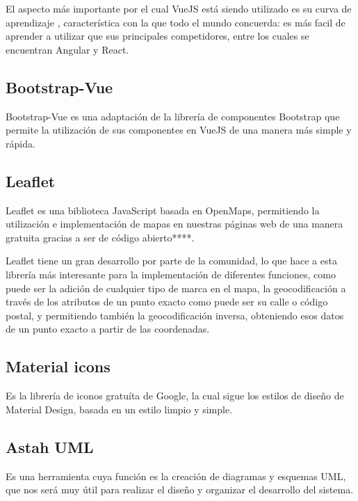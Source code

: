 El aspecto más importante por el cual VueJS está siendo utilizado es su curva de aprendizaje , característica con la que todo el mundo concuerda: es más facil de aprender a utilizar que sus principales competidores, entre los cuales se encuentran Angular y React.

    \subsection{Bootstrap-Vue}

Bootstrap-Vue es una adaptación de la librería de componentes Bootstrap que permite la utilización de sus componentes en VueJS de una manera más simple y rápida.

    \subsection{Leaflet}

Leaflet es una biblioteca JavaScript basada en OpenMaps, permitiendo la utilización e implementación de mapas en nuestras páginas web de una manera gratuita gracias a ser de código abierto****.

Leaflet tiene un gran desarrollo por parte de la comunidad, lo que hace a esta librería más interesante para la implementación de diferentes funciones, como puede ser la adición de cualquier tipo de marca en el mapa, la geocodificación a través de los atributos de un punto exacto como puede ser su calle o código postal, y permitiendo también la geocodificación inversa, obteniendo esos datos de un punto exacto a partir de las coordenadas.

    \subsection{Material icons}

Es la librería de iconos gratuíta de Google, la cual sigue los estilos de diseño de Material Design, basada en un estilo limpio y simple.

    \subsection{Astah UML}
Es una herramienta cuya función es la creación de diagramas y esquemas UML, que nos será muy útil para realizar el diseño y organizar el desarrollo del sistema.
